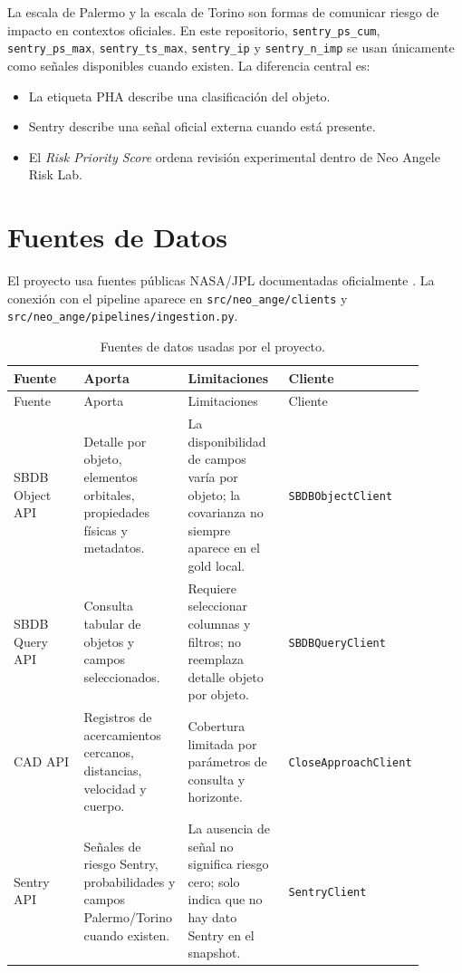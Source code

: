 \documentclass[12pt,a4paper]{report}
\newcommand{\code}[1]{\texttt{#1}}
\DeclareRobustCommand{\filepath}[1]{\nolinkurl{#1}}
\begin{document}
La escala de Palermo y la escala de Torino son formas de comunicar riesgo de impacto en contextos oficiales. En este repositorio, \code{sentry\_ps\_cum}, \code{sentry\_ps\_max}, \code{sentry\_ts\_max}, \code{sentry\_ip} y \code{sentry\_n\_imp} se usan únicamente como señales disponibles cuando existen. La diferencia central es:

\begin{itemize}
  \item La etiqueta PHA describe una clasificación del objeto.
  \item Sentry describe una señal oficial externa cuando está presente.
  \item El \emph{Risk Priority Score} ordena revisión experimental dentro de Neo Angele Risk Lab.
\end{itemize}

\chapter{Fuentes de Datos}

El proyecto usa fuentes públicas NASA/JPL documentadas oficialmente \cite{jpl_sbdb,jpl_sbdb_query,jpl_cad,jpl_sentry}. La conexión con el pipeline aparece en \filepath{src/neo_ange/clients} y \filepath{src/neo_ange/pipelines/ingestion.py}.

\begin{longtable}{>{\RaggedRight\arraybackslash}p{0.20\linewidth}>{\RaggedRight\arraybackslash}p{0.26\linewidth}>{\RaggedRight\arraybackslash}p{0.26\linewidth}>{\RaggedRight\arraybackslash}p{0.18\linewidth}}
\caption{Fuentes de datos usadas por el proyecto.}\\
\toprule
Fuente & Aporta & Limitaciones & Cliente\\
\midrule
\endfirsthead
\toprule
Fuente & Aporta & Limitaciones & Cliente\\
\midrule
\endhead
SBDB Object API & Detalle por objeto, elementos orbitales, propiedades físicas y metadatos. & La disponibilidad de campos varía por objeto; la covarianza no siempre aparece en el gold local. & \code{SBDBObjectClient}\\
SBDB Query API & Consulta tabular de objetos y campos seleccionados. & Requiere seleccionar columnas y filtros; no reemplaza detalle objeto por objeto. & \code{SBDBQueryClient}\\
CAD API & Registros de acercamientos cercanos, distancias, velocidad y cuerpo. & Cobertura limitada por parámetros de consulta y horizonte. & \code{CloseApproachClient}\\
Sentry API & Señales de riesgo Sentry, probabilidades y campos Palermo/Torino cuando existen. & La ausencia de señal no significa riesgo cero; solo indica que no hay dato Sentry en el snapshot. & \code{SentryClient}\\
\bottomrule
\end{longtable}
\end{document}
